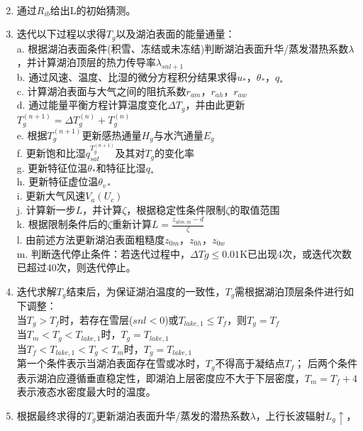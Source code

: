 \begin{enumerate}
\begin{equation}
\begin{array}{cl}
            \end{array}
        \end{equation}
    \item 通过$R_{ib}$给出L的初始猜测。
    \item 迭代以下过程以求得$T_g$以及湖泊表面的能量通量：\\
    a. 根据湖泊表面条件(积雪、冻结或未冻结)判断湖泊表面升华/蒸发潜热系数$\lambda$，并计算湖泊顶层的热力传导率$\lambda_{snl+1}$ \\
    b. 通过风速、温度、比湿的微分方程积分结果求得$u_\ast$，$\theta_\ast$，$q_\ast$ \\
    c. 计算湖泊表面与大气之间的阻抗系数$r_{am}$，$r_{ah}$，$r_{aw}$ \\
    d. 通过能量平衡方程计算温度变化$\Delta T_g$，并由此更新$T_g^{\left(n+1\right)}=\Delta T_g^{\left(n\right)}+T_g^{\left(n\right)}$ \\
    e. 根据$T_g^{\left(n+1\right)}$更新感热通量$H_g$与水汽通量$E_g$ \\
    f. 更新饱和比湿$q_{sat}^{T_g^{\left(n+1\right)}}$及其对$T_g$的变化率 \\
    g. 更新特征位温$\theta_\ast$和特征比湿$q_\ast$ \\
    h. 更新特征虚位温$\theta_{v\ast}$ \\
    i. 更新大气风速$V_a\left(U_c\right)$ \\
    j. 计算新一步$L$，并计算$\zeta$，根据稳定性条件限制$\zeta$的取值范围 \\
    k. 根据限制条件后的$\zeta$重新计算$L=\frac{z_{atm,m}-d}{\zeta}$ \\
    l. 由前述方法更新湖泊表面粗糙度$z_{0m}$，$z_{0h}$，$z_{0w}$\\
    m. 判断迭代停止条件：若迭代过程中，$\Delta Tg\leq 0.01$K已出现4次，或迭代次数已超过40次，则迭代停止。
    \item 迭代求解$T_g$结束后，为保证湖泊温度的一致性，$T_g$需根据湖泊顶层条件进行如下调整：\\
    当$T_g>T_f$时，若存在雪层($snl<0$)或$T_{lake,1}\le T_f$，则$T_g=T_f$ \\
    当$T_m<T_g<T_{lake,1}$时，$T_g=T_{lake,1}$ \\
    当$T_f<T_{lake,1}<T_g<T_m$时，$T_g=T_{lake,1}$ \\
    第一个条件表示当湖泊表面存在雪或冰时，$T_g$不得高于凝结点$T_f$；
    后两个条件表示湖泊应遵循垂直稳定性，即湖泊上层密度应不大于下层密度，$T_m=T_f+4$表示液态水密度最大时的温度。
    \item 根据最终求得的$T_g$更新湖泊表面升华/蒸发的潜热系数$\lambda$，上行长波辐射$L_g\uparrow$，

\end{enumerate}
